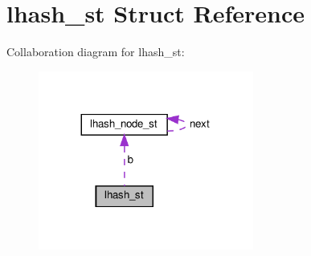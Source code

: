\hypertarget{structlhash__st}{}\section{lhash\+\_\+st Struct Reference}
\label{structlhash__st}


Collaboration diagram for lhash\+\_\+st\+:
\nopagebreak
\begin{figure}[H]
\begin{center}
\leavevmode
\includegraphics[width=200pt]{structlhash__st__coll__graph}
\end{center}
\end{figure}
